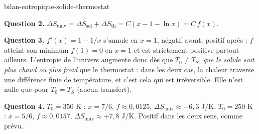 \begin{exo}{bilan-entropique-solide-thermostat}
\begin{solution}
\textbf{Question 2.} $\Delta S_{\text{univ}} = \Delta S_{\text{sol}} + \Delta S_{\text{th}} = C(x - 1 - \ln x) = C\,f(x)$.

\textbf{Question 3.} $f'(x) = 1 - 1/x$ s'annule en $x = 1$, négatif avant, positif après : $f$ atteint son minimum $f(1) = 0$ en $x=1$ et est strictement positive partout ailleurs. L'entropie de l'univers augmente donc dès que $T_0 \neq T_S$, \emph{que le solide soit plus chaud ou plus froid} que le thermostat : dans les deux cas, la chaleur traverse une différence finie de température, et c'est cela qui est irréversible. Elle n'est nulle que pour $T_0 = T_S$ (aucun transfert).

\textbf{Question 4.} $T_0 = 350$ K : $x = 7/6$, $f \approx 0{,}0125$, $\Delta S_{\text{univ}} \approx +6{,}3$ J/K. $T_0 = 250$ K : $x = 5/6$, $f \approx 0{,}0157$, $\Delta S_{\text{univ}} \approx +7{,}8$ J/K. Positif dans les deux sens, comme prévu.
\end{solution}
\end{exo}

